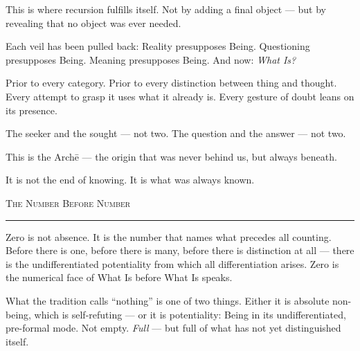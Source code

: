 \documentclass[10pt, openany, oneside]{book}
\begin{document}
\vspace{1em}

\noindent This is where recursion fulfills itself. Not by adding a final object --- but by revealing that no object was ever needed.

\vspace{0.5em}

\noindent Each veil has been pulled back: Reality presupposes Being. Questioning presupposes Being. Meaning presupposes Being. And now: \textit{What Is?}

\vspace{0.5em}

\noindent Prior to every category. Prior to every distinction between thing and thought. Every attempt to grasp it uses what it already is. Every gesture of doubt leans on its presence.

\vspace{0.5em}

\noindent The seeker and the sought --- not two. The question and the answer --- not two.

\vspace{0.5em}

\noindent This is the Arch\={e} --- the origin that was never behind us, but always beneath.

\vspace{0.5em}

\noindent It is not the end of knowing. It is what was always known.

\vspace{2em}

\begin{center}
    {\scshape The Number Before Number}\\[0.3em]
    \rule{0.2\textwidth}{0.3pt}
\end{center}

\vspace{1em}

\noindent Zero is not absence. It is the number that names what precedes all counting. Before there is one, before there is many, before there is distinction at all --- there is the undifferentiated potentiality from which all differentiation arises. Zero is the numerical face of What Is before What Is speaks.

\vspace{0.5em}

\noindent What the tradition calls ``nothing'' is one of two things. Either it is absolute non-being, which is self-refuting --- or it is potentiality: Being in its undifferentiated, pre-formal mode. Not empty. \textit{Full} --- but full of what has not yet distinguished itself.
\end{document}
